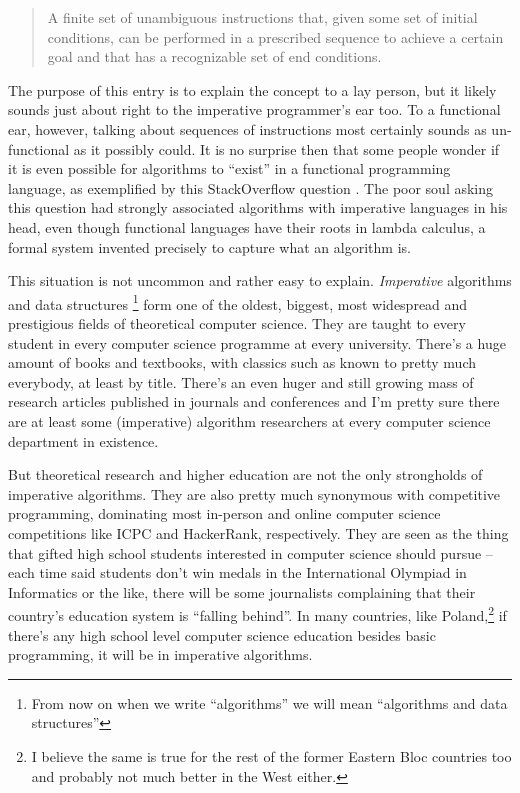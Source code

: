 \documentclass[declaration,mgr,english,shortabstract]{iithesis}
\begin{document}
\begin{quote}
    A finite set of unambiguous instructions that, given some set of initial conditions, can be performed in a prescribed sequence to achieve a certain goal and that has a recognizable set of end conditions.
\end{quote}

The purpose of this entry is to explain the concept to a lay person, but it likely sounds just about right to the imperative programmer's ear too. To a functional ear, however, talking about sequences of instructions most certainly sounds as un-functional as it possibly could. It is no surprise then that some people wonder if it is even possible for algorithms to ``exist'' in a functional programming language, as exemplified by this StackOverflow question \cite{SO}. The poor soul asking this question had strongly associated algorithms with imperative languages in his head, even though functional languages have their roots in lambda calculus, a formal system invented precisely to capture what an algorithm is.

This situation is not uncommon and rather easy to explain. \textit{Imperative} algorithms and data structures \footnote{From now on when we write ``algorithms'' we will mean ``algorithms and data structures''} form one of the oldest, biggest, most widespread and prestigious fields of theoretical computer science. They are taught to every student in every computer science programme at every university. There's a huge amount of books and textbooks, with classics such as \cite{CLRS} \cite{TAOCP} known to pretty much everybody, at least by title. There's an even huger and still growing mass of research articles published in journals and conferences and I'm pretty sure there are at least some (imperative) algorithm researchers at every computer science department in existence.

But theoretical research and higher education are not the only strongholds of imperative algorithms. They are also pretty much synonymous with competitive programming, dominating most in-person and online computer science competitions like ICPC and HackerRank, respectively. They are seen as the thing that gifted high school students interested in computer science should pursue -- each time said students don't win medals in the International Olympiad in Informatics or the like, there will be some journalists complaining that their country's education system is ``falling behind''. In many countries, like Poland,\footnote{I believe the same is true for the rest of the former Eastern Bloc countries too and probably not much better in the West either.} if there's any high school level computer science education besides basic programming, it will be in imperative algorithms.
\end{document}
